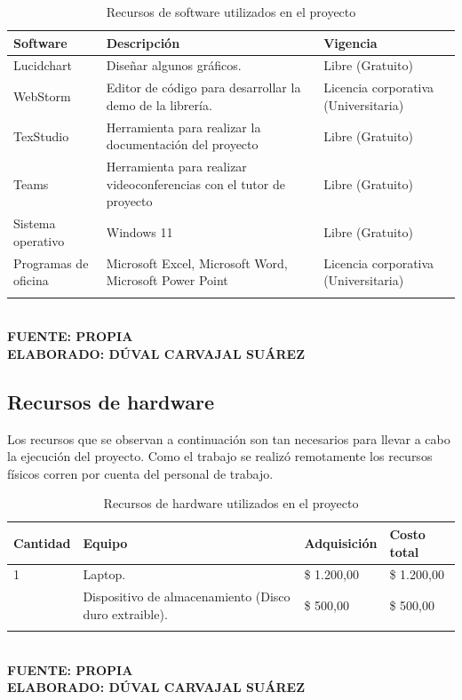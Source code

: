 \begin{table}[h!]
	\caption{Recursos de software utilizados en el proyecto}
	\begin{tabular}{p{3cm}p{6cm}p{5cm}}
		\toprule
		\textbf{Software} & \textbf{Descripción} & \textbf{Vigencia} \\
		\midrule
		Lucidchart & Diseñar algunos gráficos. & Libre (Gratuito) \\
		\addlinespace
		WebStorm & Editor de código para desarrollar la demo de la librería. & Licencia corporativa (Universitaria) \\
		\addlinespace
		TexStudio & Herramienta para realizar la documentación del proyecto & Libre (Gratuito) \\
		\addlinespace
		Teams & Herramienta para realizar videoconferencias con el tutor de proyecto & Libre (Gratuito) \\
		\addlinespace
		Sistema operativo & Windows 11 & Libre (Gratuito) \\
		\addlinespace
		Programas de oficina & Microsoft Excel, Microsoft Word, Microsoft Power Point & Licencia corporativa (Universitaria) \\
		\addlinespace
		\bottomrule
	\end{tabular}
	
	\textbf{\\ FUENTE: PROPIA \\ ELABORADO: DÚVAL CARVAJAL SUÁREZ}
\end{table}

\subsection{Recursos de hardware}

Los recursos que se observan a continuación son tan necesarios para llevar a cabo la ejecución del proyecto. Como el trabajo se realizó remotamente los recursos físicos corren por cuenta del personal de trabajo.

\begin{table}[h!]
	\caption{Recursos de hardware utilizados en el proyecto}
	\begin{tabular}{p{2cm}p{5cm}p{3cm}p{3cm}}
		\toprule
		\textbf{Cantidad} & \textbf{Equipo} & \textbf{Adquisición} & \textbf{Costo total} \\
		\midrule
		1 & Laptop. & \$ 1.200,00 & \$ 1.200,00  \\
		\addlinespace
		1 & Dispositivo de almacenamiento (Disco duro extraible). & \$ 500,00 & \$ 500,00  \\
		\addlinespace
		\bottomrule
	\end{tabular}

	\textbf{\\ FUENTE: PROPIA \\ ELABORADO: DÚVAL CARVAJAL SUÁREZ}
\end{table}


